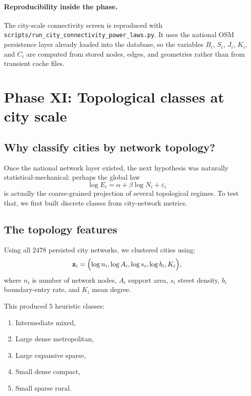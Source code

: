 \documentclass[11pt]{article}
\begin{document}
\paragraph{Reproducibility inside the phase.}
The city-scale connectivity screen is reproduced with
\texttt{scripts/run\_city\_connectivity\_power\_laws.py}.
It uses the national OSM persistence layer already loaded into the database, so the variables \(B_i\), \(S_i\), \(J_i\), \(K_i\), and \(C_i\) are computed from stored nodes, edges, and geometries rather than from transient cache files.

\section{Phase XI: Topological classes at city scale}

\subsection{Why classify cities by network topology?}

Once the national network layer existed, the next hypothesis was naturally statistical-mechanical: perhaps the global law
\begin{equation}
\log E_i = \alpha + \beta \log N_i + \varepsilon_i
\end{equation}
is actually the coarse-grained projection of several topological regimes. To test that, we first built discrete classes from city-network metrics.

\subsection{The topology features}

Using all \(2478\) persisted city networks, we clustered cities using:
\begin{equation}
\mathbf{z}_i =
\Bigl(
\log n_i,
\log A_i,
\log s_i,
\log b_i,
K_i
\Bigr),
\end{equation}
where \(n_i\) is number of network nodes, \(A_i\) support area, \(s_i\) street density, \(b_i\) boundary-entry rate, and \(K_i\) mean degree.

This produced \(5\) heuristic classes:
\begin{enumerate}[label=\arabic*.,leftmargin=2.0em]
\item Intermediate mixed,
\item Large dense metropolitan,
\item Large expansive sparse,
\item Small dense compact,
\item Small sparse rural.
\end{enumerate}
\end{document}
